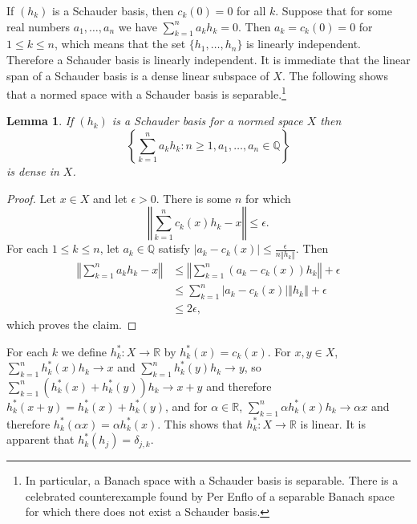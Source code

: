 \documentclass{article}
\newcommand{\norm}[1]{\left\Vert #1 \right\Vert}
\newtheorem{lemma}[theorem]{Lemma}
\theoremstyle{definition}
\begin{document}
If $(h_k)$ is a Schauder basis, then
$c_k(0)=0$ for all $k$. Suppose that for some real numbers $a_1,\ldots,a_n$ we have
  $\sum_{k=1}^n a_k h_k=0$. Then $a_k=c_k(0)=0$ for $1 \leq k \leq n$, which means that the set $\{h_1,\ldots,h_n\}$ is linearly independent. 
Therefore a Schauder basis is linearly independent. 
It is immediate that the linear span of a Schauder basis is a dense linear subspace of $X$. 
The following shows that a normed space with a Schauder basis is separable.\footnote{In particular, a Banach
space with a Schauder basis is separable. There is a celebrated counterexample found by Per Enflo of a separable
Banach space for which there does not exist a Schauder basis.}

\begin{lemma}
If $(h_k)$ is a Schauder basis for a normed space $X$ then
\[
\left\{\sum_{k=1}^n a_k h_k: n \geq 1, a_1,\ldots,a_n \in \mathbb{Q}\right\}
\]
is dense in $X$. 
\end{lemma}
\begin{proof}
Let $x \in X$ and let $\epsilon>0$. There is some $n$ for which 
\[
\norm{\sum_{k=1}^n c_k(x) h_k - x} \leq \epsilon.
\]
For each $1 \leq k \leq n$, let $a_k \in \mathbb{Q}$ satisfy $|a_k-c_k(x)| \leq \frac{\epsilon}{n \norm{h_k}}$. Then
\begin{align*}
\norm{\sum_{k=1}^n a_k h_k -x} &\leq 
\norm{\sum_{k=1}^n (a_k-c_k(x))h_k} + \epsilon\\
&\leq \sum_{k=1}^n |a_k-c_k(x)| \norm{h_k} + \epsilon\\
&\leq 2\epsilon,
\end{align*}
which proves the claim.
\end{proof}


For each $k$ we define $h_k^*:X \to \mathbb{R}$ by $h_k^*(x)=c_k(x)$. 
For $x,y \in X$, $\sum_{k=1}^n h_k^*(x)h_k \to x$ and $\sum_{k=1}^n h_k^*(y)h_k \to y$,
so $\sum_{k=1}^n (h_k^*(x)+h_k^*(y))h_k \to x+y$ and therefore $h_k^*(x+y)=h_k^*(x)+h_k^*(y)$, and for $\alpha \in \mathbb{R}$,
$\sum_{k=1}^n \alpha h_k^*(x) h_k \to \alpha x$ and therefore $h_k^*(\alpha x)=\alpha h_k^*(x)$.
This shows that $h_k^*:X \to \mathbb{R}$ is linear. 
It is apparent that $h_k^*(h_j)=\delta_{j,k}$. 
\end{document}
